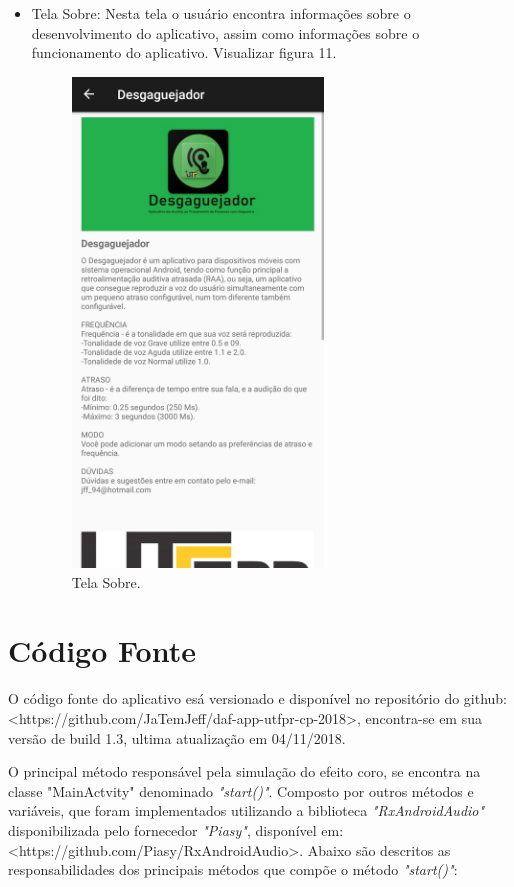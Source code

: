 \begin{itemize}
	\item  Tela Sobre: Nesta tela o usu\'ario encontra informa\c{c}\~oes sobre o desenvolvimento do aplicativo, assim como informa\c{c}\~oes sobre o funcionamento do aplicativo. Visualizar figura 11.
	\begin{figure}[H]
		\centering
		\caption[Tela Sobre]{Tela Sobre. \label{fig:prototiposobre}}
		\includegraphics[height=13cm]{./Figuras/prototipo_sobre.png}%
	\end{figure}
\end{itemize}

\section{C\'odigo Fonte}

O c\'odigo fonte do aplicativo es\'a versionado e dispon\'ivel no reposit\'orio do github: <https://github.com/JaTemJeff/daf-app-utfpr-cp-2018>, encontra-se em sua vers\~ao de build 1.3, ultima atualiza\c{c}\~ao em 04/11/2018. 

O principal m\'etodo respons\'avel pela simula\c{c}\~ao do efeito coro, se encontra na classe "MainActvity" denominado \textit{"start()"}. Composto por outros m\'etodos e vari\'aveis, que foram implementados utilizando a biblioteca \textit{"RxAndroidAudio"} disponibilizada pelo fornecedor \textit{"Piasy"}, dispon\'ivel em: <https://github.com/Piasy/RxAndroidAudio>. Abaixo s\~ao descritos as responsabilidades dos principais m\'etodos que comp\~oe o m\'etodo \textit{"start()"}: 

